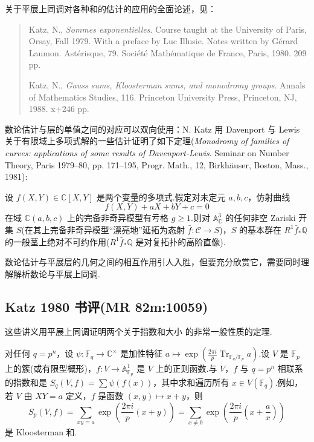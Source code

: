 关于平展上同调对各种和的估计的应用的全面论述，见：
\begin{quote}
Katz, N., \emph{Sommes exponentielles}. Course taught at the University of Paris, Orsay, Fall 1979. With a preface by Luc Illusie. Notes written by G\'erard Laumon. Ast\'erisque, 79. Soci\'et\'e Math\'ematique de France, Paris, 1980. 209 pp.

Katz, N., \emph{Gauss sums, Kloosterman sums, and monodromy groups}. Annals of Mathematics Studies, 116. Princeton University Press, Princeton, NJ, 1988. x+246 pp.
\end{quote}

数论估计与层的单值之间的对应可以双向使用：N. Katz 用 Davenport 与 Lewis 关于有限域上多项式解的一些估计证明了如下定理(\emph{Monodromy of families of curves: applications of some results of Davenport-Lewis}. Seminar on Number Theory, Paris 1979--80, pp. 171--195, Progr. Math., 12, Birkh\"auser, Boston, Mass., 1981):

\begin{theorem}\label{thm:34.2}
设 $f(X, Y) \in \mathbb{C}[X, Y]$ 是两个变量的多项式.假定对未定元 $a, b, c$，仿射曲线
\[
f(X, Y) + aX + bY + c = 0
\]
在域 $\mathbb{C}(a, b, c)$ 上的完备非奇异模型有亏格 $g \geq 1$.则对 $\mathbb{A}^{3}_{\mathbb{C}}$ 的任何非空 Zariski 开集 $S$(在其上完备非奇异模型``漂亮地''延拓为态射 $\bar{f} \colon \mathcal{C} \to S$)，$S$ 的基本群在 $R^{1}\bar{f}_{*}\mathbb{Q}$ 的一般茎上绝对不可约作用($R^{1}\bar{f}_{*}\mathbb{Q}$ 是对复拓扑的高阶直像).
\end{theorem}

数论估计与平展层的几何之间的相互作用引人入胜，但要充分欣赏它，需要同时理解解析数论与平展上同调.

\subsection*{Katz 1980 书评(MR 82m:10059)}

这些讲义用平展上同调证明两个关于指数和大小 的非常一般性质的定理.

对任何 $q = p^{n}$，设 $\psi \colon \mathbb{F}_q \to \mathbb{C}^{\times}$ 是加性特征 $a \mapsto \exp\left( \frac{2\pi i}{p} \operatorname{Tr}_{\mathbb{F}_q/\mathbb{F}_p} a \right)$.设 $V$ 是 $\mathbb{F}_p$ 上的簇(或有限型概形)，$f \colon V \to \mathbb{A}^{1}_{\mathbb{F}_p}$ 是 $V$ 上的正则函数.与 $V$，$f$ 与 $q = p^{n}$ 相联系的指数和是 $S_q(V, f) = \sum \psi(f(x))$，其中求和遍历所有 $x \in V(\mathbb{F}_q)$.例如，若 $V$ 由 $XY = a$ 定义，$f$ 是函数 $(x, y) \mapsto x + y$，则
\[
S_p(V, f) = \sum_{xy = a} \exp\left( \frac{2\pi i}{p}(x + y) \right) = \sum_{x \neq 0} \exp\left( \frac{2\pi i}{p}\left( x + \frac{a}{x} \right) \right)
\]
是 Kloosterman 和.

